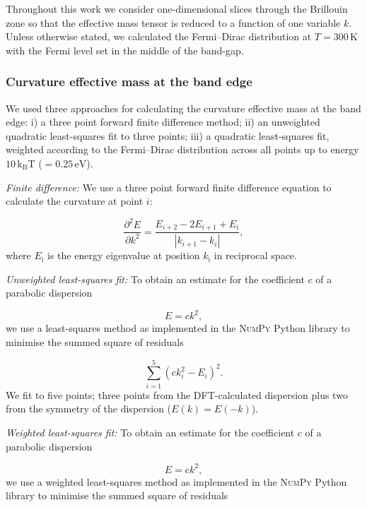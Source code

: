 Throughout this work we consider one-dimensional slices through the Brillouin zone so that the effective mass tensor is reduced to a function of one variable $k$. Unless otherwise stated, we calculated the Fermi--Dirac distribution at $T=300\,\mathrm{K}$ with the Fermi level set in the middle of the band-gap.

\subsubsection{Curvature effective mass at the band edge}

We used three approaches for calculating the curvature effective mass at the band edge: i) a three point forward finite difference method; ii) an unweighted quadratic least-squares fit\autocite{Vanderwalt2011} to three points; iii) a quadratic least-squares fit, weighted according to the Fermi--Dirac distribution across all points up to energy $10\,\mathrm{k_BT}$ ($=0.25\,\mathrm{eV}$).

\textit{Finite difference:} We use a three point forward finite difference equation to calculate the curvature at point $i$:

\begin{equation}
\frac{\partial^2E}{\partial k^2} = \frac{E_{i+2} - 2E_{i+1} + E_i}{\left|k_{i+1} - k_i\right|},
\end{equation}
where $E_\mathrm{i}$ is the energy eigenvalue at position $k_\mathrm{i}$ in reciprocal space. 

\textit{Unweighted least-squares fit:} To obtain an estimate for the coefficient $c$ of a parabolic dispersion

\begin{equation}
E = {c}k^2,
\end{equation}
we use a least-squares method as implemented in the \textsc{NumPy} Python library to minimise the summed square of residuals

\begin{equation}
\sum^{5}_{i=1}(\mathrm{c}k_{i}^2 - E_{i})^2.
\end{equation}
We fit to five points; three points from the DFT-calculated dispersion plus two from the symmetry of the dispersion ($E(k)=E(-k)$).

\textit{Weighted least-squares fit:} To obtain an estimate for the coefficient $c$ of a parabolic dispersion

\begin{equation}
E = \mathrm{c}k^2,
\end{equation}
we use a weighted least-squares method as implemented in the \textsc{NumPy} Python library to minimise the summed square of residuals

